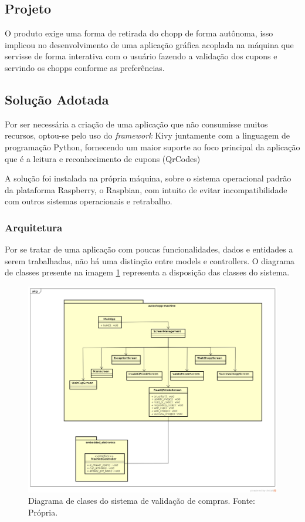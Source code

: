 \subsection[Projeto]{Projeto}
O produto exige uma forma de retirada do chopp de forma autônoma, isso implicou no desenvolvimento
de uma aplicação gráfica acoplada na máquina que servisse de forma interativa com o usuário fazendo
a validação dos cupons e servindo os chopps conforme as preferências.

\subsection[Solução Adotada]{Solução Adotada}
Por ser necessária a criação de uma aplicação que não consumisse muitos recursos, optou-se pelo
uso do \textit{framework} Kivy juntamente com a linguagem de programação Python, fornecendo
um maior suporte ao foco principal da aplicação que é a leitura e reconhecimento de cupons (QrCodes)

A solução foi instalada na própria máquina, sobre o sistema operacional padrão
da plataforma Raspberry, o Raspbian, com intuito de evitar incompatibilidade com outros
sistemas operacionais e retrabalho.

\subsubsection[Arquitetura]{Arquitetura}
Por se tratar de uma aplicação com poucas funcionalidades, dados e entidades a serem trabalhadas,
não há uma distinção entre models e controllers. O diagrama de classes presente na imagem 
\ref{classes-kivy} representa a disposição das classes do sistema.

\begin{figure}[!htb]
    \centering
    \includegraphics[scale= 0.3]{figuras/autochopp-machine-diagrama.png}        
    \caption{Diagrama de clases do sistema de validação de compras. Fonte: Própria.}
    \label{classes-kivy}
\end{figure}

